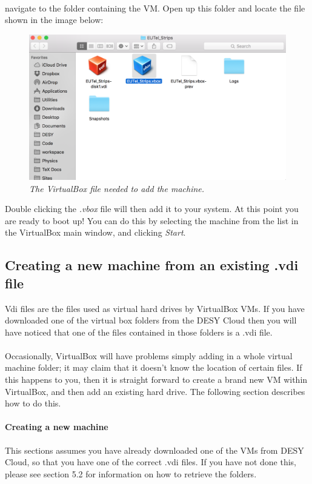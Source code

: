 \documentclass[11pt]{article}
\begin{document}
\paragraph{}
navigate to the folder containing the VM. Open up this folder and locate the file shown in the image below:
\begin{figure}[!ht]
	\centering
	\includegraphics[scale=0.3]{vbfile.png}
	\caption{\textit{The VirtualBox file needed to add the machine.}}
\end{figure}
Double clicking the \textit{.vbox} file will then add it to your system. At this point you are ready to boot up! You can do this by selecting the machine from the list in the VirtualBox main window, and clicking \textit{Start}.
\subsection{Creating a new machine from an existing .vdi file}
Vdi files are the files used as virtual hard drives by VirtualBox VMs. If you have downloaded one of the virtual box folders from the DESY Cloud then you will have noticed that one of the files contained in those folders is a .vdi file.
\paragraph{}
Occasionally, VirtualBox will have problems simply adding in a whole virtual machine folder; it may claim that it doesn't know the location of certain files. If this happens to you, then it is straight forward to create a brand new VM within VirtualBox, and then add an existing hard drive. The following section describes how to do this.
\paragraph{Creating a new machine}
This sections assumes you have already downloaded one of the VMs from DESY Cloud, so that you have one of the correct .vdi files. If you have not done this, please see section 5.2 for information on how to retrieve the folders.
\end{document}
